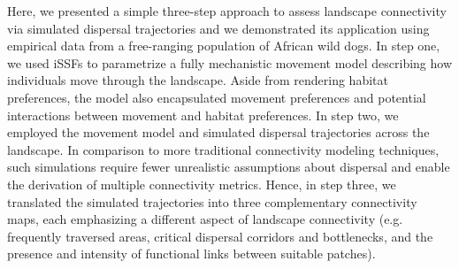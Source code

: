 \documentclass[../FinalThesis.tex]{subfiles}
\begin{document}
Here, we presented a simple three-step approach to assess landscape connectivity
via simulated dispersal trajectories and we demonstrated its application using
empirical data from a free-ranging population of African wild dogs. In step one,
we used iSSFs to parametrize a fully mechanistic movement model describing how
individuals move through the landscape. Aside from rendering habitat
preferences, the model also encapsulated movement preferences and potential
interactions between movement and habitat preferences. In step two, we employed
the movement model and simulated dispersal trajectories across the landscape. In
comparison to more traditional connectivity modeling techniques, such
simulations require fewer unrealistic assumptions about dispersal and enable the
derivation of multiple connectivity metrics. Hence, in step three, we translated
the simulated trajectories into three complementary connectivity maps, each
emphasizing a different aspect of landscape connectivity (e.g. frequently
traversed areas, critical dispersal corridors and bottlenecks, and the presence
and intensity of functional links between suitable patches).
\end{document}
